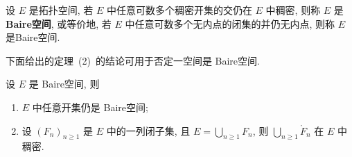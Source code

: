 	\begin{Definition}[Baire空间]\label{def:Baire空间}
		设 $ E $ 是拓扑空间, 若 $ E $ 中任意可数多个稠密开集的交仍在 $ E $ 中稠密, 则称 $ E $ 是\textbf{Baire空间}, 或等价地, 若 $ E $ 中任意可数多个无内点的闭集的并仍无内点, 则称 $ E $ 是Baire空间. 
	\end{Definition}

	下面给出的定理~(2)~的结论可用于否定一空间是 Baire空间. 
	\begin{Theorem}[Baire推论]
		设 $ E $ 是 Baire空间, 则
		\begin{enumerate}[(1)]
			\item $ E $ 中任意开集仍是 Baire空间;
			\item 设 $ (F_{n})_{n\geqslant1} $ 是 $ E $ 中的一列闭子集, 且 $ E = \bigcup_{n\geqslant1}F_{n} $, 则 $ \bigcup_{n\geqslant1}\mathring{F}_{n} $ 在 $ E $ 中稠密.
		\end{enumerate}
	\end{Theorem}

